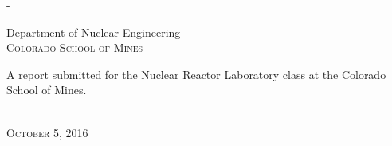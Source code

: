 \begin{titlingpage}
\begin{SingleSpace}
\begin{adjustwidth*}{\unitlength}{-\unitlength}
\begin{center}
\vspace{6mm}
{\large Department of Nuclear Engineering\\
\textsc{Colorado School of Mines}}\\
\vspace{11mm}
\begin{minipage}{10cm}
A report submitted for the Nuclear Reactor Laboratory class at the Colorado School of Mines.
\end{minipage}\\
\vspace{9mm}
{\large\textsc{October 5, 2016}}
\vspace{12mm}
\end{center}
\end{adjustwidth*}
\end{SingleSpace}
\end{titlingpage}
